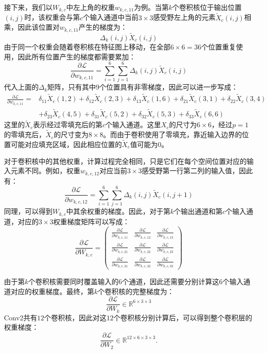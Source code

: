 接下来，我们以$W_{k,c}$中左上角的权重$w_{k,c,11}$为例。当第$k$个卷积核位于输出位置$(i,j)$时，该权重会与第$c$个输入通道中当前$3\times3$感受野左上角的元素$\tilde{X}_c(i,j)$相乘，因此该位置对$w_{k,c,11}$产生的梯度为：
$$
\Delta_k(i,j)\tilde{X}_c(i,j)
$$
由于同一个权重会随着卷积核在特征图上移动，在全部$6\times6=36$个位置重复使用，因此所有位置产生的梯度都需要累加：
$$
\frac{\partial\mathcal{L}}{\partial w_{k,c,11}}=\sum_{i=1}^{6}\sum_{j=1}^{6}\Delta_k(i,j)\tilde{X}_c(i,j)
$$
代入上面的$\Delta_k$矩阵，只有其中$9$个位置具有非零梯度，因此可以进一步写成：
$$
\begin{aligned}
\frac{\partial\mathcal{L}}{\partial w_{k,c,11}}
={}&
\delta_{11}\tilde{X}_c(1,2)+\delta_{12}\tilde{X}_c(2,3)+\delta_{13}\tilde{X}_c(1,6)+\delta_{21}\tilde{X}_c(3,1)+\delta_{22}\tilde{X}_c(3,4)\\
&+\delta_{23}\tilde{X}_c(4,5)+\delta_{31}\tilde{X}_c(5,2)+\delta_{32}\tilde{X}_c(5,3)+\delta_{33}\tilde{X}_c(6,6)
\end{aligned}
$$
这里的$\tilde{X}_c$表示经过零填充后的第$c$个输入通道。这里$X_c$的尺寸为$6\times6$，经过$p=1$的零填充后，$\tilde X_c$的尺寸变为$8\times8$。而由于卷积使用了零填充，靠近输入边界的位置可能对应填充区域，因此相应位置的$\tilde{X}_c$值可能为$0$。

对于卷积核中的其他权重，计算过程完全相同，只是它们在每个空间位置对应的输入元素不同。例如，权重$w_{k,c,12}$对应当前$3\times3$感受野第一行第二列的输入值，因此有：
$$
\frac{\partial\mathcal{L}}{\partial w_{k,c,12}}=\sum_{i=1}^{6}\sum_{j=1}^{6}\Delta_k(i,j)\tilde{X}_c(i,j+1)
$$
同理，可以得到$W_{k,c}$中其余权重的梯度。因此，对于第$k$个输出通道和第$c$个输入通道，对应的$3\times3$权重梯度矩阵可以写成：
$$
\frac{\partial\mathcal{L}}{\partial W_{k,c}}=
\begin{pmatrix}
\frac{\partial\mathcal{L}}{\partial w_{k,c,11}}&
\frac{\partial\mathcal{L}}{\partial w_{k,c,12}}&
\frac{\partial\mathcal{L}}{\partial w_{k,c,13}}\\
\frac{\partial\mathcal{L}}{\partial w_{k,c,21}}&
\frac{\partial\mathcal{L}}{\partial w_{k,c,22}}&
\frac{\partial\mathcal{L}}{\partial w_{k,c,23}}\\
\frac{\partial\mathcal{L}}{\partial w_{k,c,31}}&
\frac{\partial\mathcal{L}}{\partial w_{k,c,32}}&
\frac{\partial\mathcal{L}}{\partial w_{k,c,33}}
\end{pmatrix}
$$

由于第$k$个卷积核需要同时覆盖输入的$6$个通道，因此还需要分别计算这$6$个输入通道对应的权重梯度。最终，第$k$个卷积核的完整梯度为：
$$
\frac{\partial\mathcal{L}}{\partial W_k}\in\mathbb{R}^{6\times3\times3}
$$
Conv2共有$12$个卷积核，因此对这$12$个卷积核分别计算后，可以得到整个卷积层的权重梯度：
$$
\frac{\partial\mathcal{L}}{\partial W_2}\in\mathbb{R}^{12\times6\times3\times3}.
$$

